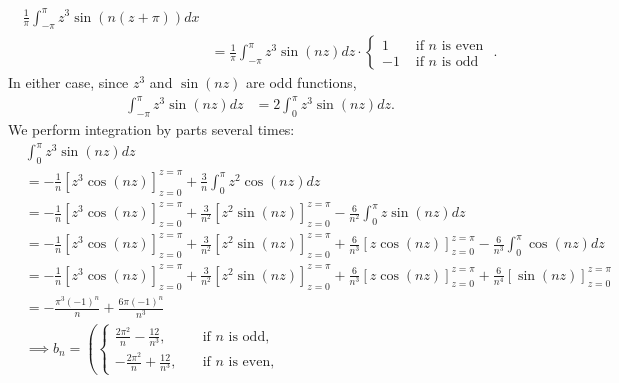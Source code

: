 \documentclass[11pt]{article}
\begin{document}
\begin{solution}
\begin{itemize}
\begin{align*}
        \frac{1}{\pi} \int_{-\pi}^{\pi} z^{3} \sin(n(z+\pi)) dx
        \\&=
        \frac{1}{\pi} \int_{-\pi}^{\pi} z^{3} \sin(nz) dz
        \cdot \left\{\begin{array}{ll} 1 & \text{ if $n$ is even } \\ -1 & \text{ if $n$ is odd } \end{array}\right.
        .
    \end{align*}
    In either case, since $z^3$ and $\sin(nz)$ are odd functions,
    \begin{align*}
        \int_{-\pi}^{\pi} z^{3} \sin(nz) dz
        &=
        2\int_{0}^{\pi} z^{3} \sin(nz) dz
        .
    \end{align*}
    We perform integration by parts several times:
    \begin{align*}
        &
        \int_{0}^{\pi} z^{3} \sin(nz) dz
        \\&=
        -
        \frac 1 {n} 
        \left[ z^{3} \cos(nz) \right]_{z=0}^{z=\pi}
        +
        \frac 3 {n}
        \int_{0}^{\pi} z^{2} \cos(nz) dz
        \\&=
        -
        \frac 1 {n} 
        \left[ z^{3} \cos(nz) \right]_{z=0}^{z=\pi}
        +
        \frac 3 {n^2} 
        \left[ z^{2} \sin(nz) \right]_{z=0}^{z=\pi}
        -
        \frac 6 {n^2} 
        \int_{0}^{\pi} z \sin(nz) dz
        \\&=
        - \frac 1 {n} 
        \left[ z^{3} \cos(nz) \right]_{z=0}^{z=\pi}
        + 
        \frac 3 {n^2}
        \left[ z^{2} \sin(nz) \right]_{z=0}^{z=\pi}
        +
        \frac 6 {n^3} 
        \left[ z \cos(nz) \right]_{z=0}^{z=\pi}
        -
        \frac 6 {n^3} 
        \int_{0}^{\pi} \cos(nz) dz
        \\&=
        - \frac 1 {n} 
        \left[ z^{3} \cos(nz) \right]_{z=0}^{z=\pi}
        + 
        \frac 3 {n^2}
        \left[ z^{2} \sin(nz) \right]_{z=0}^{z=\pi}
        +
        \frac 6 {n^3} 
        \left[ z \cos(nz) \right]_{z=0}^{z=\pi}
        +
        \frac 6 {n^4} 
        \left[ \sin(nz) \right]_{z=0}^{z=\pi}
        \\&=
	-\frac{\pi^3(-1)^n}{n}+\frac{6\pi(-1)^n}{n^3} 
	\\&\implies
            b_n = 
            \left(
                \begin{cases}
                \frac{2\pi^2}{n}-\frac{12}{n^3}  ,\quad &\text{if } n\text{ is odd,}\\
                -\frac{2\pi^2}{n}+\frac{12}{n^3}   ,\quad &\text{if } n\text{ is even,}

\end{cases}
\end{align*}
\end{itemize}
\end{solution}
\end{document}
